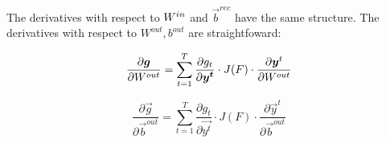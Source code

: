 The derivatives with respect to $W^{in}$ and $\vec{b}^{rec}$ have the same structure.
The derivatives with respect to $W^{out}, b^{out}$ are straightfoward:

\begin{equation}
\frac{\partial \boldsymbol{g}}{\partial W^{out}} = \sum_{t=1}^T \frac{\partial g_t}{\partial \boldsymbol{y^t}} \cdot J(F) \cdot \frac{\partial \boldsymbol{y}^t}{\partial W^{out}} 
\end{equation}

\begin{equation}
\frac{\partial \vec{g}}{\partial \vec{b}^{out}} = \sum_{t=1}^T \frac{\partial g_t}{\partial \vec{y^t}} \cdot J(F) \cdot \frac{\partial \vec{y}^t}{\partial \vec{b}^{out}} 
\end{equation}







